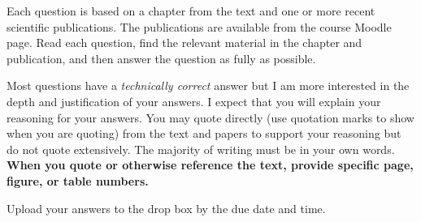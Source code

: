\documentclass[12pt, addpoints]{exam}
\begin{document}
Each question is based on a chapter from the text and one or more recent scientific publications. 
The publications are available from the course Moodle page. Read each question, find the 
relevant material in the chapter and publication, and then answer the question as fully
as possible.

Most questions have a \emph{technically correct} answer but I am more interested in
the depth and justification of your answers. I expect that you will explain your reasoning 
for your answers. You may quote directly (use quotation marks to  show when you are quoting) from the text and papers to 
support your reasoning but do not quote extensively. The majority of writing must be in
your own words. \textbf{When you quote or otherwise reference the text, provide specific page, figure, or table numbers.}

Upload your answers to the drop box by the due date and time.
\end{document}
